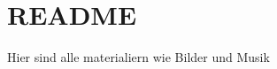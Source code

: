 \chapter{README}
\hypertarget{md_assets_2_r_e_a_d_m_e}{}\label{md_assets_2_r_e_a_d_m_e}
Hier sind alle materialiern wie Bilder und Musik 